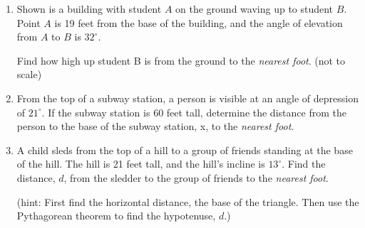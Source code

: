\documentclass[12pt, twoside]{article}
\begin{document}
\begin{enumerate}
\newpage
\item Shown is a building with student $A$ on the ground waving up to student $B$. Point $A$ is 19 feet from the base of the building, and the angle of elevation from $A$ to $B$ is $32^\circ$.
 
Find how high up student B is from the ground to the \emph{nearest foot}. \hfill (not to scale)
  \begin{flushright}
    \end{flushright}

\item From the top of a subway station, a person is visible at an angle of depression of $21^\circ$. If the subway station is 60 feet tall, determine the distance from the person to the base of the subway station, x, to the \emph{nearest foot}.
\begin{flushright}
  \end{flushright} \vspace{1.5cm}

\item A child sleds from the top of a hill to a group of friends standing at the base of the hill. The hill is 21 feet tall, and the hill's incline is $13^\circ$. Find the distance, $d$, from the sledder to the group of friends to the \emph{nearest foot}.

(hint: First find the horizontal distance, the base of the triangle. Then use the Pythagorean theorem to find the hypotenuse, $d$.)
\begin{flushright}
\end{flushright}\vspace{4cm}


\end{enumerate}
\end{document}

